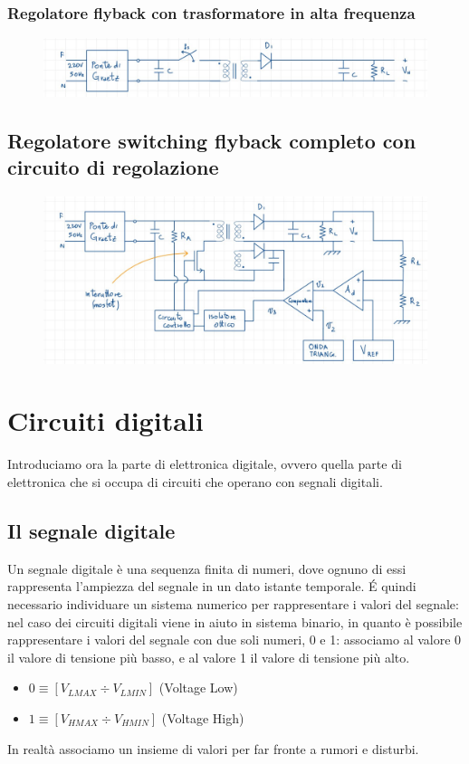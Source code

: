 \documentclass[11pt,a4paper,]{article}
\begin{document}
\subsubsection{Regolatore flyback con trasformatore in alta frequenza}
\begin{figure}[H]
    \centering
    \includegraphics[width=0.5\linewidth]{img/reg flyb con tr.png}
\end{figure}
\subsection{Regolatore switching flyback completo con circuito di regolazione}
\begin{figure}[H]
    \centering
    \includegraphics[width=0.75\linewidth]{img/mega circuito.png}
\end{figure}

\section{Circuiti digitali}
Introduciamo ora la parte di elettronica digitale, ovvero quella parte di elettronica che si occupa di circuiti che operano con segnali digitali.
\subsection{Il segnale digitale}
Un segnale digitale è una sequenza finita di numeri, dove ognuno di essi rappresenta l'ampiezza del segnale in un dato istante temporale. É quindi necessario individuare un sistema numerico per rappresentare i valori del segnale: nel caso dei circuiti digitali viene in aiuto in sistema binario, in quanto è possibile rappresentare i valori del segnale con due soli numeri, 0 e 1: associamo al valore 0 il valore di tensione più basso, e al valore 1 il valore di tensione più alto.
\begin{itemize}
    \item $0 \equiv [V_{LMAX} \div V_{LMIN}]$ (Voltage Low)
    \item $1 \equiv [V_{HMAX} \div V_{HMIN}]$ (Voltage High)
\end{itemize}
\begin{nota}
    In realtà associamo un insieme di valori per far fronte a rumori e disturbi.
\end{nota}
\end{document}
